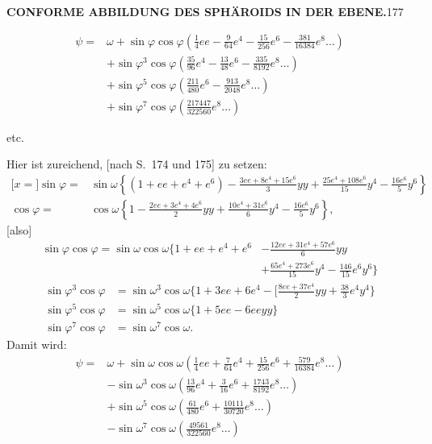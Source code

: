 \par\clearpage
\noindent\null\hfill{\small\textbf{CONFORME ABBILDUNG DES SPHÄROIDS IN DER EBENE.}}\hfill177\par\medskip
\[
\begin{aligned}
\psi={}&\omega+\sin\varphi\cos\varphi(\tfrac14ee-\tfrac9{64}e^4-\tfrac{15}{256}e^6-\tfrac{381}{16384}e^8\ldots)\\
&+\sin\varphi^3\cos\varphi(\tfrac{35}{96}e^4-\tfrac{13}{48}e^6-\tfrac{335}{8192}e^8\ldots)\\
&+\sin\varphi^5\cos\varphi(\tfrac{211}{480}e^6-\tfrac{913}{2048}e^8\ldots)\\
&+\sin\varphi^7\cos\varphi(\tfrac{217447}{322560}e^8\ldots)
\end{aligned}
\]
{\centering etc.\par}
Hier ist zureichend, [nach S.~174 und 175] zu setzen:
\[
\begin{aligned}
\mathopen{[}x={}]\sin\varphi={}&\sin\omega\left\{(1+ee+e^4+e^6)-\frac{3ee+8e^4+15e^6}{3}yy+\frac{25e^4+108e^6}{15}y^4-\frac{16e^6}{5}y^6\right\}\\
\cos\varphi={}&\cos\omega\left\{1-\frac{2ee+3e^4+4e^6}{2}yy+\frac{10e^4+31e^6}{6}y^4-\frac{16e^6}{5}y^6\right\},
\end{aligned}
\]
[also]
\[
\begin{aligned}
\sin\varphi\cos\varphi=\sin\omega\cos\omega\biggl\{1+ee+e^4+e^6&-\frac{12ee+31e^4+57e^6}{6}yy\\
&+\frac{65e^4+273e^6}{15}y^4-\frac{146}{15}e^6y^6\biggr\}
\end{aligned}
\]
\[
\begin{aligned}
\sin\varphi^3\cos\varphi&=\sin\omega^3\cos\omega\biggl\{1+3ee+6e^4-\biggl[\frac{8ee+37e^4}{2}yy+\frac{38}{3}e^4y^4\biggr\}\\
\sin\varphi^5\cos\varphi&=\sin\omega^5\cos\omega\{1+5ee-6eeyy\}\\
\sin\varphi^7\cos\varphi&=\sin\omega^7\cos\omega.
\end{aligned}
\]
Damit wird:
\[
\begin{aligned}
\psi={}&\omega+\sin\omega\cos\omega(\tfrac14ee+\tfrac7{64}e^4+\tfrac{15}{256}e^6+\tfrac{579}{16384}e^8\ldots)\\
&-\sin\omega^3\cos\omega(\tfrac{13}{96}e^4+\tfrac3{16}e^6+\tfrac{1743}{8192}e^8\ldots)\\
&+\sin\omega^5\cos\omega(\tfrac{61}{480}e^6+\tfrac{10111}{30720}e^8\ldots)\\
&-\sin\omega^7\cos\omega(\tfrac{49561}{322560}e^8\ldots)
\end{aligned}
\]
